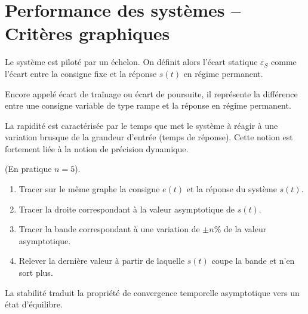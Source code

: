 \documentclass[10pt,fleqn]{article} %
\begin{document}
\newpage

\section{Performance des systèmes -- Critères graphiques}
\begin{defi}

Le système est piloté par un échelon. On définit alors l'écart statique $\varepsilon_S$ comme l'écart entre la consigne fixe et la réponse $s(t)$ en régime permanent.
\end{defi}

\begin{defi}

Encore appelé écart de traînage ou écart de poursuite, il représente la différence entre une consigne variable de type rampe et la réponse en régime permanent. 
\end{defi}

\begin{defi}[Rapidité]

La rapidité est caractérisée par le temps que met le système à réagir à une
variation brusque de la grandeur d'entrée (temps de réponse). Cette notion est
fortement liée à la notion de précision dynamique.
\end{defi}

\begin{methode}
 (En pratique $n=5$).\\

\begin{enumerate}
 \item Tracer sur le même graphe la consigne $e(t)$ et la réponse du système
$s(t)$.
\item Tracer la droite correspondant à la valeur asymptotique de $s(t)$.
\item Tracer la bande correspondant à une variation de $\pm n\%$ de la valeur
asymptotique.
\item Relever la dernière valeur à partir de laquelle $s(t)$ coupe la bande et
n'en sort plus.
\end{enumerate}
\end{methode}


\begin{center}

\hfill

\end{center}

\begin{defi}[Stabilité]

La stabilité traduit la propriété de convergence temporelle asymptotique vers
un état d'équilibre. 
\end{defi}
\end{document}

